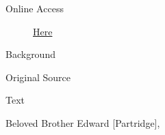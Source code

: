 			\begin{description}
				\item[Online Access] \href{https://www.josephsmithpapers.org/paper-summary/letter-to-church-leaders-in-jackson-county-missouri-21-april-1833/1}{Here}
			\end{description}
			
			\begin{description}
				\item[Background]
			\end{description}
			
			
			\begin{description}
				\item[Original Source]
			\end{description}
			
			
			\begin{description}
				\item[Text]
			\end{description}
			
				
				Beloved Brother Edward [Partridge],
				
